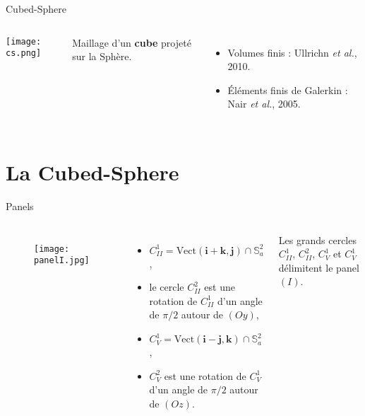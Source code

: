 \documentclass[11pt]{beamer}
\def\Vect{\text{Vect}}
\begin{document}
\begin{frame}{Cubed-Sphere}
\begin{columns}
\begin{center}
\texttt{[image: cs.png]}
\end{center}


Maillage d'un \textbf{cube} projeté sur la Sphère.

\begin{itemize}
\item Volumes finis : Ullrichn \textit{et al.}, 2010.

\item \'Eléments finis de Galerkin : Nair \textit{et al.}, 2005.
\end{itemize}


\end{columns}
\end{frame}


\section{La Cubed-Sphere}
\begin{frame}{Panels}
\begin{columns}
\begin{figure}[htbp]
\begin{center}
\texttt{[image: panelI.jpg]}
\end{center}
\end{figure}

\begin{itemize}
\item $C_{II}^1 = \Vect(\mathbf{i}+\mathbf{k}, \mathbf{j}) \cap \mathbb{S}_a^2$,
\item le cercle $C_{II}^2$ est une rotation de $C_{II}^1$ d'un angle de $\pi/2$ autour de $(Oy)$,
\item $C_V^1 = \Vect(\mathbf{i}-\mathbf{j}, \mathbf{k}) \cap \mathbb{S}_a^2$,
\item $C_V^2$ est une rotation de $C_V^1$ d'un angle de $\pi/2$ autour de $(Oz)$.
\end{itemize}

\begin{block}{}
Les grands cercles $C_{II}^1$, $C_{II}^2$, $C_V^1$ et $C_V^1$ délimitent le panel $(I)$.
\end{block}
\end{columns}
\end{frame}
\end{document}
